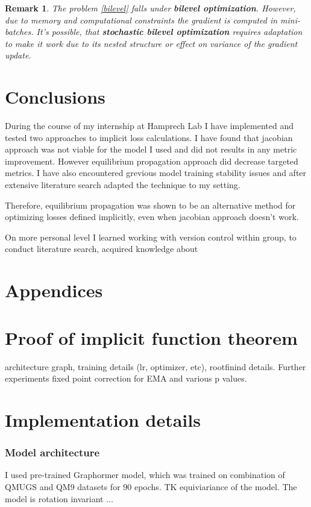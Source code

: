 \documentclass[a4paper,10pt]{report}
\newtheorem{remark}{Remark}
\begin{document}
\begin{remark}
 The problem \ref{bilevel} falls under \textbf{bilevel optimization}. However, due to memory and computational constraints the gradient is computed in mini-batches. It's possible, that \textbf{stochastic bilevel optimization} requires adaptation to make it work due to its nested structure or effect on variance of the gradient update.
\end{remark}
\newpage
\section{Conclusions}
During the course of my internship at Hamprech Lab I have implemented and tested two approaches to implicit loss calculations. I have found that jacobian approach was not viable for the model I used and did not results in any metric improvement.
However equilibrium propagation approach did decrease targeted metrics. I have also encountered grevious model training stability issues and after extensive literature search adapted the technique to my setting.

Therefore, equilibrium propagation was shown to be an alternative method for optimizing losses defined implicitly, even when jacobian approach doesn't work.

On more personal level I learned working with version control within group, to conduct literature search, acquired knowledge about
\nocite{*}




\section{Appendices}



\appendix
\section{Proof of implicit function theorem}

architecture graph, training details (lr, optimizer, etc), rootfinind details.
Further experiments
fixed point correction for EMA and various p values.
\appendix
\section{Implementation details} \label{sec:impl}

\subsubsection{Model architecture}
I used pre-trained Graphormer model, which was trained on combination of QMUGS and QM9 datasets for $90$ epochs.
TK equiviariance of the model.
The model is rotation invariant ...
\end{document}
